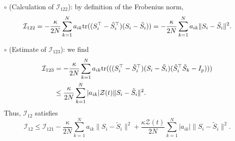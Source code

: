 \documentclass[11pt,reqno]{amsart}
\numberwithin{figure}{section}
\newcommand{\kp}{\kappa}
\newcommand{\tr}{{\textup{tr}}}
\begin{document}
$\circ$ (Calculation of $\mathcal I_{122}$): by definition of the Frobenius norm,
\[
\mathcal I_{122} = - \frac{\kp}{2N} \sum_{k=1}^N a_{ik} \tr(( S_i^\top - \tilde S_i^\top) (S_i - \tilde S_i)) = -\frac{\kp}{2N} \sum_{k=1}^N a_{ik} \|S_i - \tilde S_i\|^2 .
\]

$\circ$ (Estimate of $\mathcal I_{123}$): we find
\begin{align*}
\mathcal I_{123}  & = -\frac{\kp}{2N} \sum_{k=1}^N a_{ik} \tr(( (S_i^\top -\tilde S_i^\top)(S_i - \tilde S_i) (\tilde S_i^\top \tilde S_k - I_p))) \\
& \leq \frac{\kp}{2N}\sum_{k=1}^N |a_{ik}| \mathcal Z(t) \|S_i - \tilde S_i\|^2.
\end{align*}
Thus, $\mathcal I_{12}$ satisfies 
\begin{equation} \label{C-25}
\mathcal I_{12}  \leq \mathcal I_{121} -\frac{\kp}{2N} \sum_{k=1}^N a_{ik} \|S_i - \tilde S_i\|^2  + \frac{\kp \mathcal Z(t) }{2N}\sum_{k=1}^N |a_{ik}|  \|S_i - \tilde S_i\|^2.
\end{equation}
\end{document}
